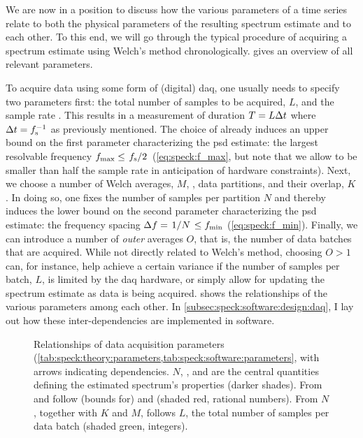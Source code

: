 We are now in a position to discuss how the various parameters of a time series relate to both the physical parameters of the resulting spectrum estimate and to each other.
To this end, we will go through the typical procedure of acquiring a spectrum estimate using Welch's method chronologically.
 gives an overview of all relevant parameters.

To acquire data using some form of (digital) \gls{daq}, one usually needs to specify two parameters first: the total number of samples to be acquired, $L$, and the sample rate \fs.
This results in a measurement of duration $T = L\Delta t$ where $\Delta t = f_{\mathrm{s}}^{-1}$ as previously mentioned.
The choice of \fs already induces an upper bound on the first parameter characterizing the \gls{psd} estimate: the largest resolvable frequency $\fmax\leq\flatfrac{\fs}{2}$ (\cf \cref{eq:speck:f_max}, but note that we allow \fmax to be smaller than half the sample rate in anticipation of hardware constraints).
Next, we choose a number of Welch averages, $M$, \ie, data partitions, and their overlap, $K$.
In doing so, one fixes the number of samples per partition $N$ and thereby induces the lower bound on the second parameter characterizing the \gls{psd} estimate: the frequency spacing $\df = \flatfrac{1}{N} \leq \fmin$ (\cf \cref{eq:speck:f_min}).
Finally, we can introduce a number of \emph{outer} averages $O$, that is, the number of data batches that are acquired.
While not directly related to Welch's method, choosing $O > 1$ can, for instance, help achieve a certain variance if the number of samples per batch, $L$, is limited by the \acrlong{daq} hardware, or simply allow for updating the spectrum estimate as data is being acquired.
 shows the relationships of the various parameters among each other.
In \cref{subsec:speck:software:design:daq}, I lay out how these inter-dependencies are implemented in software.

\begin{figure}
    \centering
    
    \caption[]{
        Relationships of data acquisition parameters (\cf \cref{tab:speck:theory:parameters,tab:speck:software:parameters}, with arrows indicating dependencies.
        $N$, \fs, and \df are the central quantities defining the estimated spectrum's properties (darker shades).
        From \fs and \df follow (bounds for) \fmax and \fmin (shaded red, rational numbers).
        From $N$, together with $K$ and $M$, follows $L$, the total number of samples per data batch (shaded green, integers).
    }
    \label{fig:speck:theory:parameters}
\end{figure}

